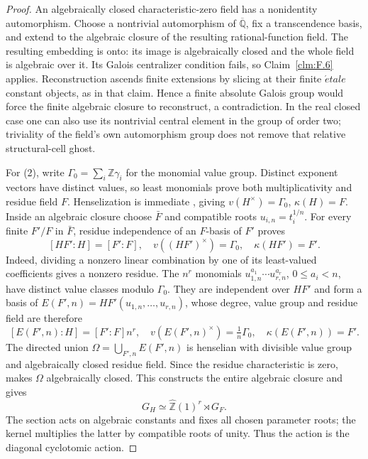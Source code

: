 \documentclass[11pt]{article}
\begin{document}
\begin{proof}
An algebraically closed characteristic-zero field has a
nonidentity automorphism. Choose a nontrivial automorphism
of \(\overline{\mathbb Q}\), fix a transcendence basis,
and extend to the algebraic closure of the resulting
rational-function field. The resulting embedding is onto:
its image is algebraically closed and the whole field is
algebraic over it. Its Galois centralizer condition fails,
so Claim~\ref{clm:F.6} applies. Reconstruction ascends
finite extensions by slicing at their finite \(\acute etale\)
constant objects, as in that claim. Hence a finite absolute
Galois group would force the finite algebraic closure to
reconstruct, a contradiction. In the real closed case one
can also use its nontrivial central element in the group
of order two; triviality of the field's own automorphism
group does not remove that relative structural-cell ghost.

For (2), write \(\Gamma_0=\sum_i\mathbb Z\gamma_i\)
for the monomial value group. Distinct exponent vectors
have distinct values, so least monomials prove both
multiplicativity and residue field \(F\). Henselization
is immediate \citep[Corollary~3.3.26]{FF_ADH2017}, giving
\(v(H^\times)=\Gamma_0\), \(\kappa(H)=F\).
Inside an algebraic closure choose \(\bar F\) and
compatible roots \(u_{i,n}=t_i^{1/n}\). For every finite
\(F'/F\) in \(\bar F\), residue independence of an
\(F\)-basis of \(F'\) proves
\[
 [HF':H]=[F':F],\quad
 v((HF')^\times)=\Gamma_0,\quad \kappa(HF')=F'.
\]
Indeed, dividing a nonzero linear combination by one of
its least-valued coefficients gives a nonzero residue.
The \(n^r\) monomials
\(u_{1,n}^{a_1}\cdots u_{r,n}^{a_r}\),
\(0\le a_i<n\), have distinct value classes modulo
\(\Gamma_0\). They are independent over \(HF'\) and
form a basis of
\(E(F',n)=HF'(u_{1,n},\ldots,u_{r,n})\), whose degree,
value group and residue field are therefore
\[
 [E(F',n):H]=[F':F]n^r,\quad
 v(E(F',n)^\times)=\tfrac1n\Gamma_0,\quad
 \kappa(E(F',n))=F'.
\]
The directed union \(\Omega=\bigcup_{F',n}E(F',n)\)
is henselian with divisible value group and algebraically
closed residue field. Since the residue characteristic
is zero, \citet[Corollary~3.3.22]{FF_ADH2017} makes
\(\Omega\) algebraically closed. This constructs the
entire algebraic closure and gives
\[
 G_H\simeq\widehat{\mathbb Z}(1)^r\rtimes G_F.
                                                        \tag{F.22.1}
\]
The section acts on algebraic constants and fixes all
chosen parameter roots; the kernel multiplies the latter
by compatible roots of unity. Thus the action is the
diagonal cyclotomic action.


\end{proof}
\end{document}
